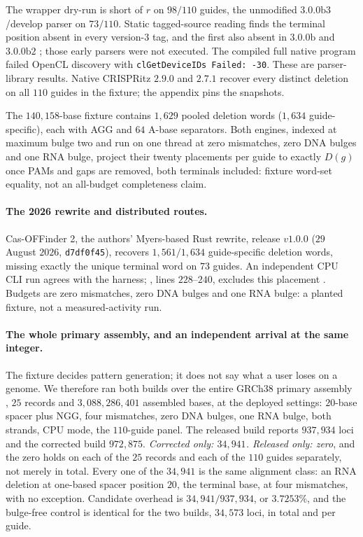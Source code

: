 The wrapper dry-run is short of $r$ on $98/110$ guides, the unmodified
$3.0.0\mathrm{b}3$/develop parser on $73/110$. Static tagged-source reading finds
the terminal position absent in every version-3 tag, and the first also absent in
$3.0.0\mathrm{b}$ and $3.0.0\mathrm{b}2$ \citep{casoffinder_v3_tags_2026}; those early
parsers were not executed. The compiled full native program failed OpenCL discovery
with \texttt{clGetDeviceIDs Failed: -30}. These are parser-library results.
Native CRISPRitz $2.9.0$ and $2.7.1$ recover every distinct deletion on all $110$
guides in the fixture; the appendix pins the snapshots.

The $140{,}158$-base fixture contains $1{,}629$ pooled deletion words ($1{,}634$
guide-specific), each with AGG and $64$ A-base separators. Both engines, indexed at maximum
bulge two and run on one thread at zero mismatches, zero DNA bulges and one RNA bulge, project
their twenty placements per guide to exactly $D(g)$ once PAMs and gaps are removed, both
terminals included: fixture word-set equality, not an all-budget completeness claim.



\paragraph{The 2026 rewrite and distributed routes.}
Cas-OFFinder 2, the authors' Myers-based Rust rewrite, release $v1.0.0$
($29$ August $2026$, \texttt{d7df0f45}), recovers $1{,}561/1{,}634$ guide-specific
deletion words, missing exactly the unique terminal word on $73$ guides.
An independent CPU CLI run agrees with the harness; ,
lines $228$--$240$, excludes this placement
\citep{casoffinder2_rust_2026,fieldlevel_audit_2026}. Budgets are zero mismatches,
zero DNA bulges and one RNA bulge: a planted fixture, not a measured-activity run.

\paragraph{The whole primary assembly, and an independent arrival at the same integer.}
The fixture decides pattern generation; it does not say what a user loses on a genome.
We therefore ran both builds over the entire GRCh38 primary assembly
\citep{schneider2017grch38}, $25$ records and
$3{,}088{,}286{,}401$ assembled bases, at the deployed settings: $20$-base spacer plus
NGG, four mismatches, zero DNA bulges, one RNA bulge, both strands, CPU mode, the $110$-guide
panel. The released build reports $937{,}934$ loci and the corrected build $972{,}875$.
\emph{Corrected only: $34{,}941$. Released only: zero}, and the zero holds on each of the
$25$ records and each of the $110$ guides separately, not merely in total. Every one of the
$34{,}941$ is the same alignment class: an RNA deletion at one-based spacer position $20$,
the terminal base, at four mismatches, with no exception. Candidate overhead is $34{,}941/937{,}934$, or $3.7253\%$, and the
bulge-free control is identical for the two builds, $34{,}573$ loci, in total and per guide.


